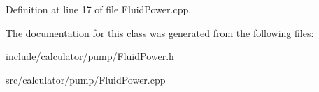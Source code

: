 Definition at line 17 of file Fluid\+Power.\+cpp.



The documentation for this class was generated from the following files\+:\begin{DoxyCompactItemize}
\item 
include/calculator/pump/Fluid\+Power.\+h\item 
src/calculator/pump/Fluid\+Power.\+cpp\end{DoxyCompactItemize}

